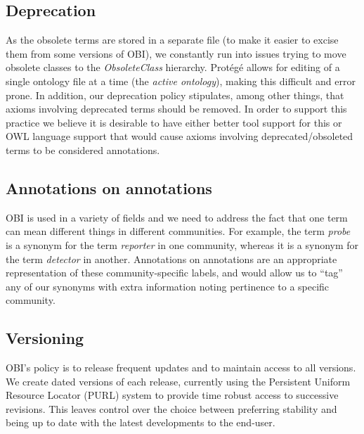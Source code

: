 \documentclass{elsart}       %
\begin{document}
\subsection{Deprecation}
As the obsolete terms are stored in a separate file (to make it easier to excise them from some versions of OBI), we constantly run into issues trying to move obsolete classes to the \emph{ObsoleteClass} hierarchy.
Prot\'eg\'e allows for editing of a single ontology file at a time (the \emph{active ontology}), making this difficult and error prone.
In addition, our deprecation policy stipulates, among other things, that axioms involving deprecated terms should be removed.
In order to support this practice we believe it is desirable to have either better tool support for this or OWL language support that would cause axioms involving deprecated/obsoleted terms to be considered annotations.

\subsection{Annotations on annotations}

OBI is used in a variety of fields and we need to address the fact that one term can mean different things in different communities. 
For example, the term \emph{probe} is a synonym for the term \emph{reporter} in one community, whereas it is a synonym for the term \emph{detector} in another.
Annotations on annotations are an appropriate representation of these community-specific labels, and would allow us to “tag” any of our synonyms with extra information noting pertinence to a specific community.

\subsection{Versioning}

OBI's policy is to release frequent updates and to maintain access to all versions.
We create dated versions of each release, currently using the Persistent Uniform Resource Locator (PURL)\cite{purl} system to provide time robust access to successive revisions.
This leaves control over the choice between preferring stability and being up to date with the latest developments to the end-user.
\end{document}

